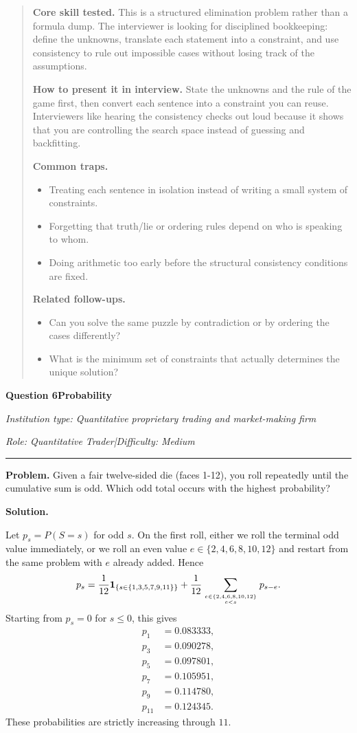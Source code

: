 \documentclass[11pt,letterpaper,openany]{book}
\newenvironment{EditorialNote}
  {\begin{quote}\small\setlength{\parskip}{0.25em}}
  {\end{quote}}
\newcommand{\QuestionSpacer}{\vspace{0.4em}}
\newcommand{\InterviewQuestionHeader}[5]{%
  \vspace{1.0em}%
  {\large\bfseries #1\enspace #4\par}%
  {\small\itshape Institution type: #2\par}%
  {\small\itshape Role: #3\enspace |\enspace Difficulty: #5\par}%
  \vspace{0.25em}\hrule\vspace{0.45em}%
}
\begin{document}
\begin{EditorialNote}


\textbf{Core skill tested.} This is a structured elimination problem rather than a formula dump. The interviewer is looking for disciplined bookkeeping: define the unknowns, translate each statement into a constraint, and use consistency to rule out impossible cases without losing track of the assumptions.

\textbf{How to present it in interview.} State the unknowns and the rule of the game first, then convert each sentence into a constraint you can reuse. Interviewers like hearing the consistency checks out loud because it shows that you are controlling the search space instead of guessing and backfitting.

\textbf{Common traps.}
\begin{itemize}
\item Treating each sentence in isolation instead of writing a small system of constraints.
\item Forgetting that truth/lie or ordering rules depend on who is speaking to whom.
\item Doing arithmetic too early before the structural consistency conditions are fixed.
\end{itemize}

\textbf{Related follow-ups.}
\begin{itemize}
\item Can you solve the same puzzle by contradiction or by ordering the cases differently?
\item What is the minimum set of constraints that actually determines the unique solution?
\end{itemize}


\end{EditorialNote}
\QuestionSpacer

\InterviewQuestionHeader{Question 6}{Quantitative proprietary trading and market-making firm}{Quantitative Trader}{Probability}{Medium}
\textbf{Problem.} Given a fair twelve-sided die (faces 1-12), you roll repeatedly until the cumulative sum is odd. Which odd total occurs with the highest probability?

\textbf{Solution.}


Let \(p_s=P(S=s)\) for odd \(s\). On the first roll, either we roll the terminal odd value immediately, or we roll an even value \(e\in\{2,4,6,8,10,12\}\) and restart from the same problem with \(e\) already added. Hence
\[
p_s=\frac{1}{12}\mathbf 1_{\{s\in\{1,3,5,7,9,11\}\}}
+\frac1{12}\sum_{e\in\{2,4,6,8,10,12\}\atop e<s}p_{s-e}.
\]
Starting from \(p_s=0\) for \(s\le0\), this gives
\[
\begin{aligned}
p_1&=0.083333,\\
p_3&=0.090278,\\
p_5&=0.097801,\\
p_7&=0.105951,\\
p_9&=0.114780,\\
p_{11}&=0.124345.
\end{aligned}
\]
These probabilities are strictly increasing through \(11\).
\end{document}
